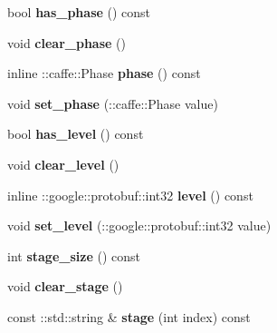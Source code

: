 \begin{DoxyCompactItemize}
\mbox{\label{classcaffe_1_1_net_state_aafd95100cc8ca5ce87c761667bbf393f}} 
bool {\bfseries has\+\_\+phase} () const
\item 
\mbox{\label{classcaffe_1_1_net_state_af50137493381c9651eaecf3464f3e2be}} 
void {\bfseries clear\+\_\+phase} ()
\item 
\mbox{\label{classcaffe_1_1_net_state_a4f86e7dca2874479af75a6bd707038a4}} 
inline \+::caffe\+::\+Phase {\bfseries phase} () const
\item 
\mbox{\label{classcaffe_1_1_net_state_adf565a17b80511fcfe893353ce5e9343}} 
void {\bfseries set\+\_\+phase} (\+::caffe\+::\+Phase value)
\item 
\mbox{\label{classcaffe_1_1_net_state_abee34a40c3349b58f21950357f850e9c}} 
bool {\bfseries has\+\_\+level} () const
\item 
\mbox{\label{classcaffe_1_1_net_state_a24e7f1b57c871344c342653f1206e683}} 
void {\bfseries clear\+\_\+level} ()
\item 
\mbox{\label{classcaffe_1_1_net_state_ac3b3f2676bcdda6c55899c26e93bbf74}} 
inline \+::google\+::protobuf\+::int32 {\bfseries level} () const
\item 
\mbox{\label{classcaffe_1_1_net_state_a17fdc4f534cfa7478c15ac5c89e14a81}} 
void {\bfseries set\+\_\+level} (\+::google\+::protobuf\+::int32 value)
\item 
\mbox{\label{classcaffe_1_1_net_state_a137a9ce4203326255cf83a38b4a70fec}} 
int {\bfseries stage\+\_\+size} () const
\item 
\mbox{\label{classcaffe_1_1_net_state_ad58c49951dc923008bbc1073f83ec7bb}} 
void {\bfseries clear\+\_\+stage} ()
\item 
\mbox{\label{classcaffe_1_1_net_state_ae73be9c61c595840b8341cc341751d55}} 
const \+::std\+::string \& {\bfseries stage} (int index) const

\end{DoxyCompactItemize}
